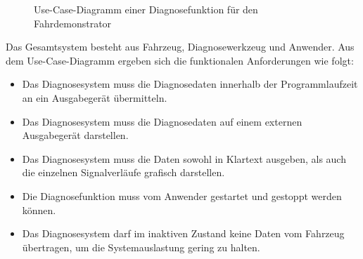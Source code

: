 \begin{figure}[!htbp]
	\centering
	\caption{Use-Case-Diagramm einer Diagnosefunktion für den Fahrdemonstrator}
	\label{abb:UseCaseDiagnose}
\end{figure}
	
Das Gesamtsystem besteht aus Fahrzeug, Diagnosewerkzeug und Anwender. Aus dem Use-Case-Diagramm ergeben sich die funktionalen Anforderungen wie folgt:

\begin{itemize}
	\item Das Diagnosesystem muss die Diagnosedaten innerhalb der Programmlaufzeit an ein Ausgabegerät übermitteln.
	\item Das Diagnosesystem muss die Diagnosedaten auf einem externen Ausgabegerät darstellen.
	\item Das Diagnosesystem muss die Daten sowohl in Klartext ausgeben, als auch die einzelnen Signalverläufe grafisch darstellen. 
	\item Die Diagnosefunktion muss vom Anwender gestartet und gestoppt werden können.
	\item Das Diagnosesystem darf im inaktiven Zustand keine Daten vom Fahrzeug übertragen, um die Systemauslastung gering zu halten.\\
\end{itemize}


